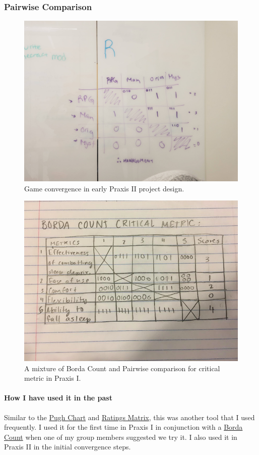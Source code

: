 \documentclass[paper=a4, fontsize=11pt]{article} %
\begin{document}
        \subsubsection{Pairwise Comparison}
            \begin{figure}[H]
                \centering
	            \includegraphics[width=0.6\linewidth]{pairwise.jpg}
	            \caption{Game convergence in early Praxis II project design.}
            \end{figure}
            \begin{figure}[H]
                \centering
	            \includegraphics[width=0.7\linewidth]{pairborda.png}
	            \caption{A mixture of Borda Count and Pairwise comparison for critical metric in Praxis I.}
            \end{figure}
            \paragraph{How I have used it in the past}
            \cite{pairwise} Similar to the \hyperlink{pughlink}{Pugh Chart} and \hyperlink{ratlink}{Ratings Matrix}, this was another tool that I used frequently. I used it for the first time in Praxis I in conjunction with a \hyperlink{bordalink}{Borda Count} when one of my group members suggested we try it. I also used it in Praxis II in the initial convergence steps.
\end{document}
